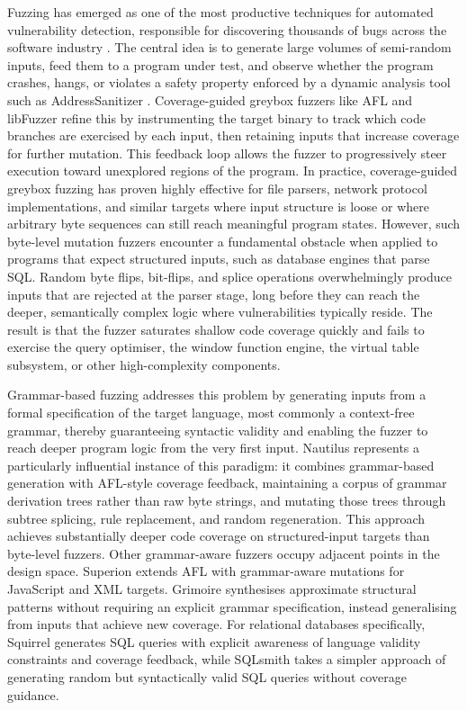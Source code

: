 Fuzzing has emerged as one of the most productive techniques for automated vulnerability detection, responsible for discovering thousands of bugs across the software industry \cite{fuzzingsurvey}. The central idea is to generate large volumes of semi-random inputs, feed them to a program under test, and observe whether the program crashes, hangs, or violates a safety property enforced by a dynamic analysis tool such as AddressSanitizer \cite{asan}. Coverage-guided greybox fuzzers like AFL \cite{afl} and libFuzzer \cite{libfuzzer} refine this by instrumenting the target binary to track which code branches are exercised by each input, then retaining inputs that increase coverage for further mutation. This feedback loop allows the fuzzer to progressively steer execution toward unexplored regions of the program. In practice, coverage-guided greybox fuzzing has proven highly effective for file parsers, network protocol implementations, and similar targets where input structure is loose or where arbitrary byte sequences can still reach meaningful program states. However, such byte-level mutation fuzzers encounter a fundamental obstacle when applied to programs that expect structured inputs, such as database engines that parse SQL. Random byte flips, bit-flips, and splice operations overwhelmingly produce inputs that are rejected at the parser stage, long before they can reach the deeper, semantically complex logic where vulnerabilities typically reside. The result is that the fuzzer saturates shallow code coverage quickly and fails to exercise the query optimiser, the window function engine, the virtual table subsystem, or other high-complexity components.

Grammar-based fuzzing addresses this problem by generating inputs from a formal specification of the target language, most commonly a context-free grammar, thereby guaranteeing syntactic validity and enabling the fuzzer to reach deeper program logic from the very first input. Nautilus \cite{nautilus} represents a particularly influential instance of this paradigm: it combines grammar-based generation with AFL-style coverage feedback, maintaining a corpus of grammar derivation trees rather than raw byte strings, and mutating those trees through subtree splicing, rule replacement, and random regeneration. This approach achieves substantially deeper code coverage on structured-input targets than byte-level fuzzers. Other grammar-aware fuzzers occupy adjacent points in the design space. Superion \cite{superion} extends AFL with grammar-aware mutations for JavaScript and XML targets. Grimoire \cite{grimoire} synthesises approximate structural patterns without requiring an explicit grammar specification, instead generalising from inputs that achieve new coverage. For relational databases specifically, Squirrel \cite{squirrel} generates SQL queries with explicit awareness of language validity constraints and coverage feedback, while SQLsmith \cite{sqlsmith} takes a simpler approach of generating random but syntactically valid SQL queries without coverage guidance.

